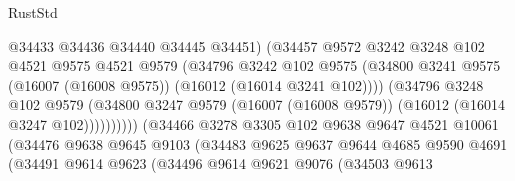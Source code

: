 \begin{lexlean}{RustStd}
\begin{coremodule}
                                      @34433
                                      @34436
                                      @34440
                                      @34445
                                      @34451)
                                    (@34457
                                      @9572
                                      @3242
                                      @3248
                                      @102
                                      @4521
                                      @9575
                                      @4521
                                      @9579
                                      (@34796
                                        @3242
                                        @102
                                        @9575
                                        (@34800
                                          @3241
                                          @9575
                                          (@16007 (@16008 @9575))
                                          (@16012 (@16014 @3241 @102))))
                                      (@34796
                                        @3248
                                        @102
                                        @9579
                                        (@34800
                                          @3247
                                          @9579
                                          (@16007 (@16008 @9579))
                                          (@16012 (@16014 @3247 @102))))))))))
                          (@34466
                            @3278
                            @3305
                            @102
                            @9638
                            @9647
                            @4521
                            @10061
                            (@34476
                              @9638
                              @9645
                              @9103
                              (@34483
                                @9625
                                @9637
                                @9644
                                @4685
                                @9590
                                @4691
                                (@34491
                                  @9614
                                  @9623
                                  (@34496
                                    @9614
                                    @9621
                                    @9076
                                    (@34503
                                      @9613

\end{coremodule}
\end{lexlean}
